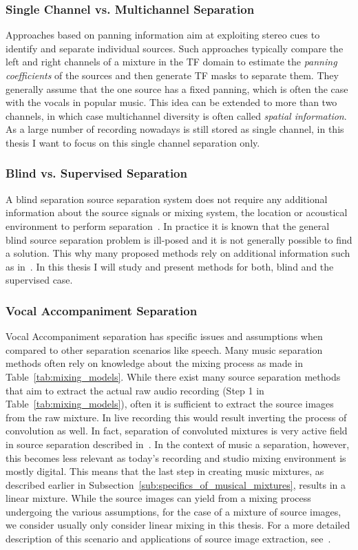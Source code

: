 \subsubsection{Single Channel vs. Multichannel Separation}
Approaches based on panning information aim at exploiting stereo cues to identify and separate individual sources. Such approaches typically compare the left and right channels of a mixture in the TF domain to estimate the \textit{panning coefficients} of the sources and then generate TF masks to separate them. They generally assume that the one source has a fixed panning, which is often the case with the vocals in popular music. This idea can be extended to more than two channels, in which case multichannel diversity is often called \textit{spatial information}.
As a large number of recording nowadays is still stored as single channel, in this thesis I want to focus on this single channel separation only.

\subsubsection{Blind vs. Supervised Separation}
A blind separation source separation system does not require any additional information about the source signals or mixing system, the location or acoustical environment to perform separation~\cite{makino07}.
In practice it is known that the general blind source separation problem is ill-posed and it is not generally possible to find a solution.
This why many proposed methods rely on additional information such as in~\cite{liutkus13, ewert14}.
In this thesis I will study and present methods for both, blind and the supervised case.

\subsubsection{Vocal Accompaniment Separation}
Vocal Accompaniment separation has specific issues and assumptions when compared to other separation scenarios like speech.
Many music separation methods often rely on knowledge about the mixing process as made in Table~\ref{tab:mixing_models}.
While there exist many source separation methods that aim to extract the actual raw audio recording (Step 1 in  Table~\ref{tab:mixing_models}), often it is sufficient to extract the source images from the raw mixture.
In live recording this would result inverting the process of convolution as well.
In fact, separation of convoluted mixtures is very active field in source separation described in~\cite{pedersen07}.
In the context of music a separation, however, this becomes less relevant as today's recording and studio mixing environment is mostly digital.
This means that the last step in creating music mixtures, as described earlier in Subsection~\ref{sub:specifics_of_musical_mixtures}, results in a linear mixture.
While the source images can yield from a mixing process undergoing the various assumptions, for the case of a mixture of source images, we consider usually only consider linear mixing in this thesis.
For a more detailed description of this scenario and applications of source image extraction, see~\cite{sturmel12}.\\

